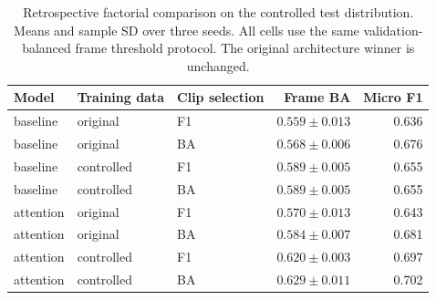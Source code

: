 \begin{table}[H]\centering\small
\caption{Retrospective factorial comparison on the controlled test distribution. Means and sample SD over three seeds. All cells use the same validation-balanced frame threshold protocol. The original architecture winner is unchanged.}\label{tab:factorial}
\begin{tabular}{lllrr}\toprule
Model & Training data & Clip selection & Frame BA & Micro F1 \\\midrule
baseline & original & F1 & $0.559 \pm 0.013$ & 0.636 \\
baseline & original & BA & $0.568 \pm 0.006$ & 0.676 \\
baseline & controlled & F1 & $0.589 \pm 0.005$ & 0.655 \\
baseline & controlled & BA & $0.589 \pm 0.005$ & 0.655 \\
attention & original & F1 & $0.570 \pm 0.013$ & 0.643 \\
attention & original & BA & $0.584 \pm 0.007$ & 0.681 \\
attention & controlled & F1 & $0.620 \pm 0.003$ & 0.697 \\
attention & controlled & BA & $0.629 \pm 0.011$ & 0.702 \\
\bottomrule\end{tabular}\end{table}